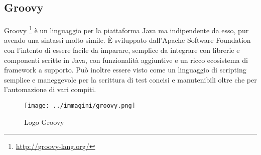 \newpage

\subsection{Groovy}

Groovy \footnote{\url{http://groovy-lang.org/}} è un linguaggio per la piattaforma Java ma indipendente da esso, pur avendo una sintassi molto simile. \`E sviluppato dall'Apache Software Foundation con l'intento di essere facile da imparare, semplice da integrare con librerie e componenti scritte in Java, con funzionalità aggiuntive e un ricco ecosistema di framework a supporto. Può inoltre essere visto come un linguaggio di scripting semplice e maneggevole per la scrittura di test concisi e manutenibili oltre che per l'automazione di vari compiti. 

\begin{figure}[H]
    \capstart
    \centering
    \texttt{[image: ../immagini/groovy.png]}
    \caption{Logo Groovy}
\end{figure}